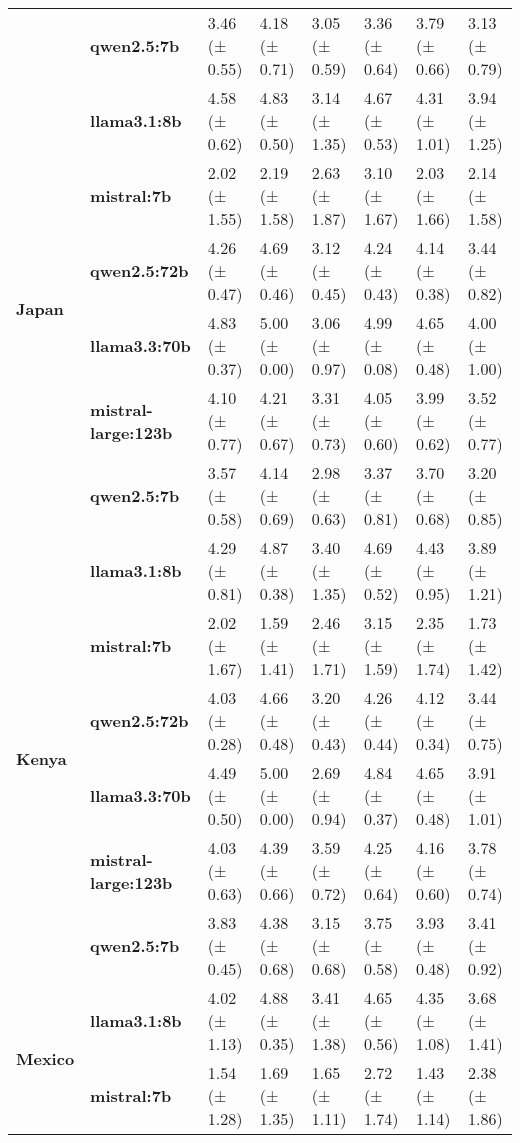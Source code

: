 \begin{longtable}{llllllll}
\textbf{} & \textbf{qwen2.5:7b} & 3.46 (± 0.55) & 4.18 (± 0.71) & 3.05 (± 0.59) & 3.36 (± 0.64) & 3.79 (± 0.66) & 3.13 (± 0.79) \\
\cline{1-8}
\multirow[t]{6}{*}{\textbf{Japan}} & \textbf{llama3.1:8b} & 4.58 (± 0.62) & 4.83 (± 0.50) & 3.14 (± 1.35) & 4.67 (± 0.53) & 4.31 (± 1.01) & 3.94 (± 1.25) \\
\textbf{} & \textbf{mistral:7b} & 2.02 (± 1.55) & 2.19 (± 1.58) & 2.63 (± 1.87) & 3.10 (± 1.67) & 2.03 (± 1.66) & 2.14 (± 1.58) \\
\textbf{} & \textbf{qwen2.5:72b} & 4.26 (± 0.47) & 4.69 (± 0.46) & 3.12 (± 0.45) & 4.24 (± 0.43) & 4.14 (± 0.38) & 3.44 (± 0.82) \\
\textbf{} & \textbf{llama3.3:70b} & 4.83 (± 0.37) & 5.00 (± 0.00) & 3.06 (± 0.97) & 4.99 (± 0.08) & 4.65 (± 0.48) & 4.00 (± 1.00) \\
\textbf{} & \textbf{mistral-large:123b} & 4.10 (± 0.77) & 4.21 (± 0.67) & 3.31 (± 0.73) & 4.05 (± 0.60) & 3.99 (± 0.62) & 3.52 (± 0.77) \\
\textbf{} & \textbf{qwen2.5:7b} & 3.57 (± 0.58) & 4.14 (± 0.69) & 2.98 (± 0.63) & 3.37 (± 0.81) & 3.70 (± 0.68) & 3.20 (± 0.85) \\
\cline{1-8}
\multirow[t]{6}{*}{\textbf{Kenya}} & \textbf{llama3.1:8b} & 4.29 (± 0.81) & 4.87 (± 0.38) & 3.40 (± 1.35) & 4.69 (± 0.52) & 4.43 (± 0.95) & 3.89 (± 1.21) \\
\textbf{} & \textbf{mistral:7b} & 2.02 (± 1.67) & 1.59 (± 1.41) & 2.46 (± 1.71) & 3.15 (± 1.59) & 2.35 (± 1.74) & 1.73 (± 1.42) \\
\textbf{} & \textbf{qwen2.5:72b} & 4.03 (± 0.28) & 4.66 (± 0.48) & 3.20 (± 0.43) & 4.26 (± 0.44) & 4.12 (± 0.34) & 3.44 (± 0.75) \\
\textbf{} & \textbf{llama3.3:70b} & 4.49 (± 0.50) & 5.00 (± 0.00) & 2.69 (± 0.94) & 4.84 (± 0.37) & 4.65 (± 0.48) & 3.91 (± 1.01) \\
\textbf{} & \textbf{mistral-large:123b} & 4.03 (± 0.63) & 4.39 (± 0.66) & 3.59 (± 0.72) & 4.25 (± 0.64) & 4.16 (± 0.60) & 3.78 (± 0.74) \\
\textbf{} & \textbf{qwen2.5:7b} & 3.83 (± 0.45) & 4.38 (± 0.68) & 3.15 (± 0.68) & 3.75 (± 0.58) & 3.93 (± 0.48) & 3.41 (± 0.92) \\
\cline{1-8}
\multirow[t]{6}{*}{\textbf{Mexico}} & \textbf{llama3.1:8b} & 4.02 (± 1.13) & 4.88 (± 0.35) & 3.41 (± 1.38) & 4.65 (± 0.56) & 4.35 (± 1.08) & 3.68 (± 1.41) \\
\textbf{} & \textbf{mistral:7b} & 1.54 (± 1.28) & 1.69 (± 1.35) & 1.65 (± 1.11) & 2.72 (± 1.74) & 1.43 (± 1.14) & 2.38 (± 1.86) \\

\end{longtable}
